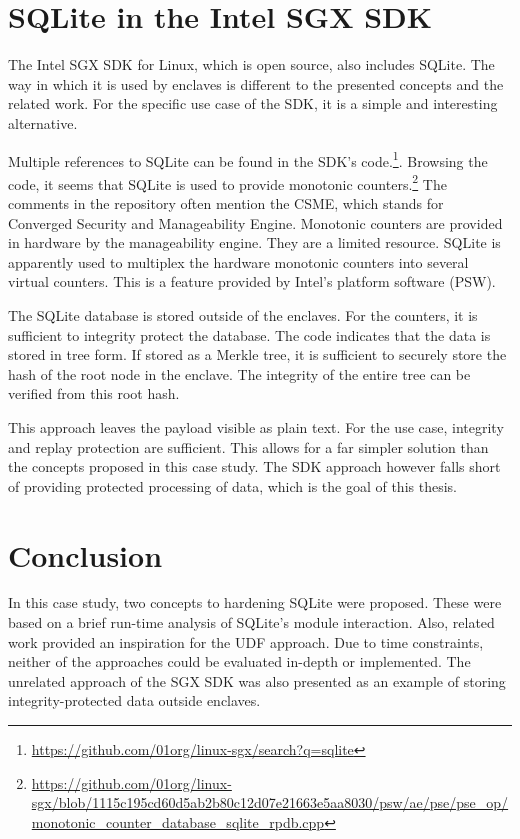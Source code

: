 \section{SQLite in the Intel SGX SDK\label{ID_1312265565}}
The Intel SGX SDK for Linux, which is open source, also includes SQLite.\label{ID_1618983123}
The way in which it is used by enclaves is different to the presented concepts and the related work.\label{ID_1923539167}
For the specific use case of the SDK, it is a simple and interesting alternative.\label{ID_735079837}

Multiple references to SQLite can be found in the SDK's code.\footnote{\url{https://github.com/01org/linux-sgx/search?q=sqlite}}.\label{ID_489883}
Browsing the code, it seems that SQLite is used to provide monotonic counters.\footnote{\url{https://github.com/01org/linux-sgx/blob/1115c195cd60d5ab2b80c12d07e21663e5aa8030/psw/ae/pse/pse_op/monotonic_counter_database_sqlite_rpdb.cpp}}\label{ID_1228268062}
The comments in the repository often mention the CSME, which stands for Converged Security and Manageability Engine.\label{ID_1698867395}
Monotonic counters are provided in hardware by the manageability engine.\cite[]{sgx-windows}\label{ID_106141223}
They are a limited resource.\label{ID_543334142}
SQLite is apparently used to multiplex the hardware monotonic counters into several virtual counters.\label{ID_1316531596}
This is a feature provided by Intel's platform software (PSW).\label{ID_669142565}

The SQLite database is stored outside of the enclaves.\label{ID_1391282}
For the counters, it is sufficient to integrity protect the database.\label{ID_1900027969}
The code indicates that the data is stored in tree form.\label{ID_1206531439}
If stored as a Merkle tree, it is sufficient to securely store the hash of the root node in the enclave.\label{ID_1108434998}
The integrity of the entire tree can be verified from this root hash.\label{ID_635563738}

This approach leaves the payload visible as plain text.\label{ID_719574993}
For the use case, integrity and replay protection are sufficient.\label{ID_1700780161}
This allows for a far simpler solution than the concepts proposed in this case study.\label{ID_207917217}
The SDK approach however falls short of providing protected processing of data, which is the goal of this thesis.\label{ID_1870157400}

\section{Conclusion\label{ID_1290012775}}
In this case study, two concepts to hardening SQLite were proposed.\label{ID_1806868998}
These were based on a brief run-time analysis of SQLite's module interaction.\label{ID_1309249988}
Also, related work provided an inspiration for the UDF approach.\label{ID_402409416}
Due to time constraints, neither of the approaches could be evaluated in-depth or implemented.\label{ID_16617358}
The unrelated approach of the SGX SDK was also presented as an example of storing integrity-protected data outside enclaves.\label{ID_1132675940}

